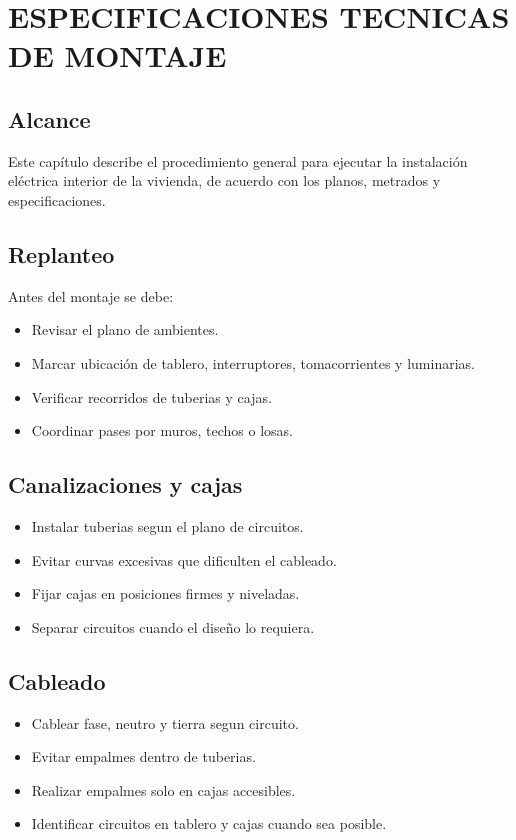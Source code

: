 \chapter{ESPECIFICACIONES TECNICAS DE MONTAJE}

\section{Alcance}

Este capítulo describe el procedimiento general para ejecutar la instalación eléctrica interior de la vivienda, de acuerdo con los planos, metrados y especificaciones.

\section{Replanteo}

Antes del montaje se debe:

\begin{itemize}
  \item Revisar el plano de ambientes.
  \item Marcar ubicación de tablero, interruptores, tomacorrientes y luminarias.
  \item Verificar recorridos de tuberias y cajas.
  \item Coordinar pases por muros, techos o losas.
\end{itemize}

\section{Canalizaciones y cajas}

\begin{itemize}
  \item Instalar tuberias segun el plano de circuitos.
  \item Evitar curvas excesivas que dificulten el cableado.
  \item Fijar cajas en posiciones firmes y niveladas.
  \item Separar circuitos cuando el diseño lo requiera.
\end{itemize}

\section{Cableado}

\begin{itemize}
  \item Cablear fase, neutro y tierra segun circuito.
  \item Evitar empalmes dentro de tuberias.
  \item Realizar empalmes solo en cajas accesibles.
  \item Identificar circuitos en tablero y cajas cuando sea posible.
\end{itemize}

